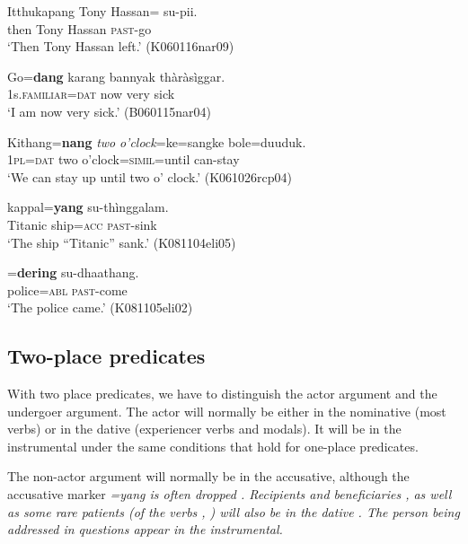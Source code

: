 \ea\label{ex:pred:argstr:1:zero:actor}
\gll Itthukapang      Tony Hassan={\zero}{\footnotemark} su-pii. \\ %
      then Tony Hassan \textsc{past}-go \\
    `Then Tony Hassan left.' (K060116nar09)
\z

 
 

\ea\label{ex:pred:argstr:1:zero:dative:exp}
\gll Go=\textbf{dang}    karang bannyak thàràsìggar. \\
     1s.\textsc{familiar}=\textsc{dat} now very sick  \\
    `I am now very sick.' (B060115nar04)
\z
 




\ea\label{ex:pred:argstr:1:zero:dative:modal}
\gll   Kithang=\textbf{nang}   \el{}    {\em two} {\em o'clock}=ke=sangke  bole=duuduk. \\
      1\textsc{pl}=\textsc{dat} { }    two o'clock=\textsc{simil}=until can-stay  \\
    `We can stay up until two o' clock.' (K061026rcp04)
\z



\ea\label{ex:pred:argstr:1:acc:titanic}
 kappal=\textbf{yang} su-thìnggalam. \\
     Titanic ship=\textsc{acc} \textsc{past}-sink  \\
    `The ship ``Titanic'' sank.' (K081104eli05)
\z

\ea\label{ex:pred:argstr:1:instr}
=\textbf{dering} su-dhaathang. \\
     police=\textsc{abl} \textsc{past}-come  \\
    `The police came.' (K081105eli02)
\z


\subsection{Two-place predicates}\label{sec:argstr:Two-placepredicates}
With two place predicates, we have to distinguish the actor argument and the undergoer argument. The actor will normally be either in the nominative (most verbs) or in the dative (experiencer verbs and modals). It will be in the instrumental under the same conditions that hold for one-place predicates.

The non-actor argument will normally be in the accusative,
although the accusative marker \em =yang \em is often dropped . 
Recipients and beneficiaries , 
as well as some rare patients (of the verbs ,  ) will also be in the dative . 
The person being addressed in questions appear in the instrumental. 


